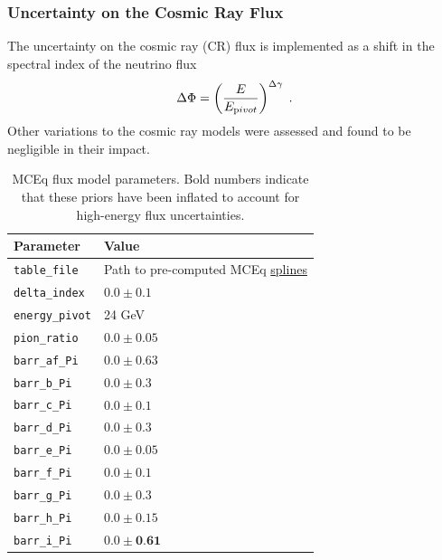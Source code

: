 \subsubsection{Uncertainty on the Cosmic Ray Flux}
The uncertainty on the cosmic ray (CR) flux is implemented as a shift in the spectral index of the neutrino flux
\begin{equation}
    \Delta \Phi = \left( \frac{E}{E_{\rm pivot}}\right)^{\Delta \gamma}\;.
\end{equation}
Other variations to the cosmic ray models were assessed and found to be negligible in their impact.

\begin{table}
\caption{MCEq flux model parameters. Bold numbers indicate that these priors have been inflated to account for high-energy flux uncertainties.}
\label{table:mceq_cfg_params}
\begin{center}
\begin{tabular}{ |l|l| } 
\hline

\textbf{Parameter} & \textbf{Value} \\ \hline

\texttt{table\_file} & Path to pre-computed MCEq \href{https://github.com/IceCubeOpenSource/fridge/tree/master/analysis/common/data/flux}{splines} \\ \hline
\texttt{delta\_index} & $0.0 \pm 0.1$ \\ \hline
\texttt{energy\_pivot} & 24 GeV \\ \hline

\texttt{pion\_ratio} & $0.0 \pm 0.05$ \\ \hline
\texttt{barr\_af\_Pi} & $0.0 \pm 0.63$ \\ \hline
\texttt{barr\_b\_Pi} & $0.0 \pm 0.3$ \\ \hline
\texttt{barr\_c\_Pi} & $0.0 \pm 0.1$ \\ \hline
\texttt{barr\_d\_Pi} & $0.0 \pm 0.3$ \\ \hline
\texttt{barr\_e\_Pi} & $0.0 \pm 0.05$ \\ \hline
\texttt{barr\_f\_Pi} & $0.0 \pm 0.1$ \\ \hline
\texttt{barr\_g\_Pi} & $0.0 \pm 0.3$ \\ \hline
\texttt{barr\_h\_Pi} & $0.0 \pm 0.15$ \\ \hline
\texttt{barr\_i\_Pi} & $0.0 \pm \textbf{0.61}$ \\ \hline


\end{tabular}
\end{center}
\end{table}
